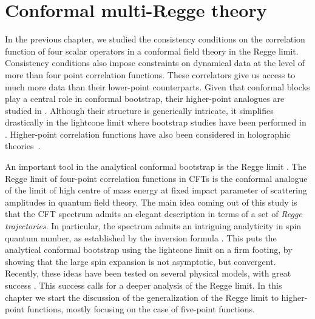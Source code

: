 \chapter{Conformal multi-Regge theory} 
\label{IntroductionMultiRegge}

In the previous chapter, we studied the consistency conditions on the correlation function of four scalar operators in a conformal field theory in the Regge limit.
Consistency conditions also impose constraints on dynamical data at the level of more than four point correlation functions.
These correlators give us access to much more data than their lower-point counterparts.
Given that conformal blocks play a central role in conformal bootstrap, their higher-point analogues are studied in \cite{Rosenhaus:2018zqn,Goncalves:2019znr,Buric:2020dyz,Buric:2021kgy,Buric:2021ttm,Buric:2021ywo,Poland:2021xjs}.
Although their structure is generically intricate, it simplifies drastically in the lightcone limit where bootstrap studies have been performed in \cite{Antunes:2021kmm,Bercini:2020msp}.
Higher-point correlation functions have also been considered in holographic theories~\cite{Goncalves:2019znr,Alday:2022lkk,Goncalves:2023oyx}.

An important tool in the analytical conformal bootstrap is the Regge limit \cite{Cornalba:2006xm,Cornalba:2007zb,Costa:2012cb}.
The Regge limit of four-point correlation functions in CFTs is the conformal analogue of the limit of high centre of mass energy  at fixed impact parameter of scattering amplitudes in quantum field theory.
The main idea coming out of this study is that the CFT spectrum  admits an elegant description in terms of a set of {\em Regge trajectories}.
In particular, the spectrum admits an intriguing analyticity in spin quantum number, as established by the inversion formula \cite{Caron-Huot:2017vep}.
This puts the analytical conformal bootstrap using the lightcone limit on a firm footing, by showing that the large spin expansion is not asymptotic, but convergent.
Recently, these ideas have been tested on several physical models, with great success \cite{Simmons-Duffin:2016wlq,Caron-Huot:2022eqs}.
This success calls for a deeper analysis of the Regge limit.
In this chapter we start the discussion of the generalization of the Regge limit to higher-point functions, mostly focusing on the case of five-point functions.

